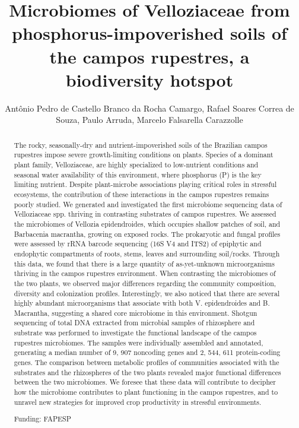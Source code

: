 \documentclass[twoside]{article}
\title{\vspace{-15mm}\fontsize{24pt}{10pt}\selectfont\textbf{ Microbiomes of Velloziaceae from phosphorus-impoverished soils of the campos rupestres,  a biodiversity hotspot }} %
\author{ Ant\^onio Pedro de Castello Branco da Rocha Camargo, Rafael Soares Correa de Souza, Paulo Arruda, Marcelo Falsarella Carazzolle }
\affil{ Universidade Estadual de Campinas }
\date{}
\begin{document}
  
  
  \maketitle %
  
  
  \thispagestyle{fancy} %
  
  
  \begin{abstract}
  The rocky,  seasonally-dry and nutrient-impoverished soils of the Brazilian campos rupestres impose severe growth-limiting conditions on plants. Species of a dominant plant family,  Velloziaceae,  are highly specialized to low-nutrient conditions and seasonal water availability of this environment,  where phosphorus (P) is the key limiting nutrient. Despite plant-microbe associations playing critical roles in stressful ecosystems,  the contribution of these interactions in the campos rupestres remains poorly studied. We generated and investigated the first microbiome sequencing data of Velloziaceae spp. thriving in contrasting substrates of campos rupestres. We assessed the microbiomes of Vellozia epidendroides,  which occupies shallow patches of soil,  and Barbacenia macrantha,  growing on exposed rocks. The prokaryotic and fungal profiles were assessed by rRNA barcode sequencing (16S V4 and ITS2) of epiphytic and endophytic compartments of roots,  stems,  leaves and surrounding soil/rocks. Through this data,  we found that there is a large quantity of as-yet-unknown microorganisms thriving in the campos rupestres environment. When contrasting the microbiomes of the two plants,  we observed major differences regarding the community composition,  diversity and colonization profiles. Interestingly,  we also noticed that there are several highly abundant microorganisms that associate with both V. epidendroides and B. Macrantha,  suggesting a shared core microbiome in this environment. Shotgun sequencing of total DNA extracted from microbial samples of rhizosphere and substrate was performed to investigate the functional landscape of the campos rupestres microbiomes. The samples were individually assembled and annotated,  generating a median number of 9, 907 noncoding genes and 2, 544, 611 protein-coding genes. The comparison between metabolic profiles of communities associated with the substrates and the rhizospheres of the two plants revealed major functional differences between the two microbiomes. We foresee that these data will contribute to decipher how the microbiome contributes to plant functioning in the campos rupestres,  and to unravel new strategies for improved crop productivity in stressful environments.
  
  Funding: FAPESP \\ 
  \end{abstract}
  
\end{document}

